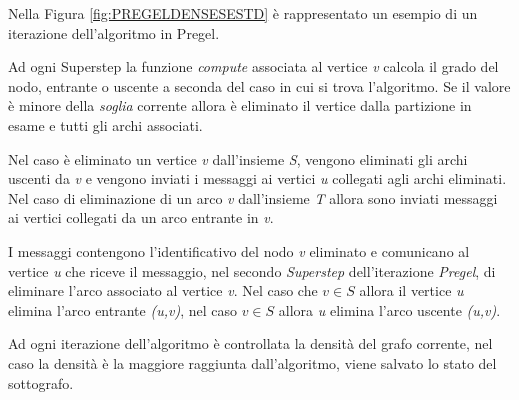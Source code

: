 \documentclass[LaM,binding=0.6cm]{sapthesis}
\begin{document}
Nella Figura \ref{fig:PREGELDENSESESTD} è rappresentato un esempio di un iterazione dell'algoritmo in Pregel.

Ad ogni Superstep la funzione \textit{compute} associata al vertice \textit{v} calcola il grado del nodo, entrante o uscente a seconda del caso in cui si trova l'algoritmo. Se il valore è minore della \textit{soglia} corrente allora è eliminato il vertice dalla partizione in esame e tutti gli archi associati.

Nel caso è eliminato un vertice \textit{v} dall'insieme \textit{S}, vengono eliminati gli archi uscenti da \textit{v} e vengono inviati i messaggi ai vertici \textit{u} collegati agli archi eliminati. Nel caso di eliminazione di un arco \textit{v} dall'insieme  \textit{T} allora sono inviati messaggi ai vertici collegati da un arco entrante in \textit{v}. 

I messaggi contengono l'identificativo del nodo \textit{v} eliminato e comunicano al vertice \textit{u} che riceve il messaggio, nel secondo \textit{Superstep} dell'iterazione \textit{Pregel}, di eliminare l'arco associato al vertice \textit{v}. Nel caso che \textit{$v\in S$} allora il vertice \textit{u} elimina l'arco entrante \textit{(u,v)}, nel caso {$v \in S$} allora \textit{u} elimina l'arco uscente \textit{(u,v)}.

Ad ogni iterazione dell'algoritmo è controllata la densità del grafo corrente, nel caso la densità è la maggiore raggiunta dall'algoritmo, viene salvato lo stato del sottografo.
\end{document}
